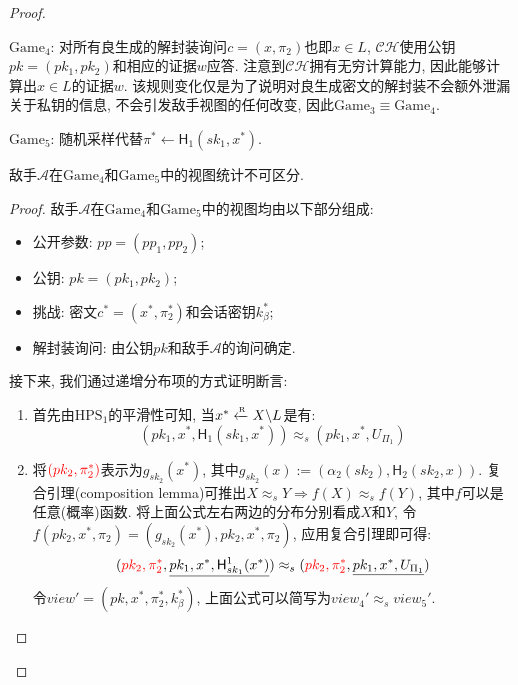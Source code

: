 \begin{proof}
\begin{trivlist}
\item $\text{Game}_4$: 对所有良生成的解封装询问$c = (x, \pi_2)$也即$x \in L$, 
    $\mathcal{CH}$使用公钥$pk = (pk_1, pk_2)$和相应的证据$w$应答. 
    注意到$\mathcal{CH}$拥有无穷计算能力, 因此能够计算出$x \in L$的证据$w$.  
    该规则变化仅是为了说明对良生成密文的解封装不会额外泄漏关于私钥的信息, 不会引发敌手视图的任何改变, 
    因此$\text{Game}_3 \equiv \text{Game}_4$. 

\item $\text{Game}_5$: 随机采样代替$\pi^* \leftarrow \mathsf{H}_1(sk_1, x^*)$. 
\end{trivlist}

\begin{claim}
敌手$\mathcal{A}$在$\text{Game}_4$和$\text{Game}_5$中的视图统计不可区分. 
\end{claim}

\begin{proof}
敌手$\mathcal{A}$在$\text{Game}_4$和$\text{Game}_5$中的视图均由以下部分组成: 
\begin{itemize}
    \item 公开参数: $pp = (pp_1, pp_2)$; 
    \item 公钥: $pk = (pk_1, pk_2)$; 
    \item 挑战: 密文$c^* = (x^*, \pi_2^*)$和会话密钥$k_\beta^*$; 
    \item 解封装询问: 由公钥$pk$和敌手$\mathcal{A}$的询问确定.  
\end{itemize}
接下来, 我们通过递增分布项的方式证明断言:
\begin{enumerate}
\item 首先由$\text{HPS}_1$的平滑性可知, 当$x^* \xleftarrow{\textup{\tiny R}} X \backslash L$是有: 
    \begin{equation*}
        (pk_1, x^*, \boxed{\mathsf{H}_1(sk_1, x^*)}) \approx_s (pk_1, x^*, \boxed{U_{\Pi_1}})
    \end{equation*}

\item 将${\color{red} (pk_2, \pi_2^*)}$表示为$g_{sk_2}(x^*)$, 其中$g_{sk_2}(x) := (\alpha_2(sk_2), \mathsf{H}_2(sk_2, x))$. 
    复合引理(composition lemma)可推出$X \approx_s Y \Rightarrow f(X) \approx_s f(Y)$, 其中$f$可以是任意(概率)函数.  
    将上面公式左右两边的分布分别看成$X$和$Y$, 令$f(pk_2, x^*, \pi_2) = (g_{sk_2}(x^*), pk_2, x^*, \pi_2)$, 应用复合引理即可得: 
    \begin{equation*}
        (\red{pk_2, \pi_2^*}, \uline{pk_1, x^*, \mathsf{H}_{sk_1}^1(x^*)}) \approx_s 
        (\red{pk_2, \pi_2^*}, \uline{pk_1, x^*, U_{\Pi_1}})
    \end{equation*}
    令$view' = (pk, x^*, \pi_2^*, k_\beta^*)$, 上面公式可以简写为$view_4' \approx_s view_5'$.


\end{enumerate}
\end{proof}
\end{proof}
